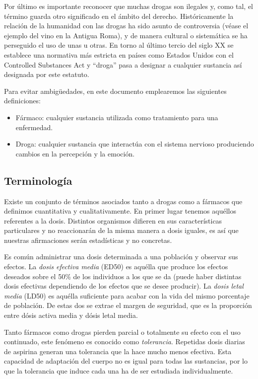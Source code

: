Por último es importante reconocer que muchas drogas son ilegales y, como tal, el término guarda otro significado en el ámbito del derecho. Históricamente la relación de la humanidad con las drogas ha sido asunto de controversia (véase el ejemplo del vino en la Antigua Roma), y de manera cultural o sistemática se ha perseguido el uso de unas u otras. En torno al último tercio del siglo XX se establece una normativa más estricta en países como Estados Unidos con el Controlled Substances Act y \enquote{droga} pasa a designar a cualquier sustancia así designada por este estatuto.

Para evitar ambigüedades, en este documento emplearemos las siguientes definiciones:

\begin{itemize}
	\item Fármaco: cualquier sustancia utilizada como tratamiento para una enfermedad.
	\item Droga: cualquier sustancia que interactúa con el sistema nervioso produciendo cambios en la percepción y la emoción.
\end{itemize}

\subsection{Terminología}

Existe un conjunto de términos asociados tanto a drogas como a fármacos que definimos cuantitativa y cualitativamente. En primer lugar tenemos aquéllos referentes a la dosis. Distintos organismos difieren en sus características particulares y no reaccionarán de la misma manera a dosis iguales, es así que nuestras afirmaciones serán estadísticas y no concretas.

Es común administrar una dosis determinada a una población y observar sus efectos. La \textit{dosis efectiva media} (ED50) es aquélla que produce los efectos deseados sobre el 50\% de los individuos a los que se da (puede haber distintas dosis efectivas dependiendo de los efectos que se desee producir). La \textit{dosis letal media} (LD50) es aquélla suficiente para acabar con la vida del mismo porcentaje de población. De estas dos se extrae el margen de seguridad, que es la proporción entre dósis activa media y dósis letal media.

Tanto fármacos como drogas pierden parcial o totalmente su efecto con el uso continuado, este fenómeno es conocido como \textit{tolerancia}. Repetidas dosis diarias de aspirina generan una tolerancia que la hace mucho menos efectiva. Esta capacidad de adaptación del cuerpo no es igual para todas las sustancias, por lo que la tolerancia que induce cada una ha de ser estudiada individualmente.


